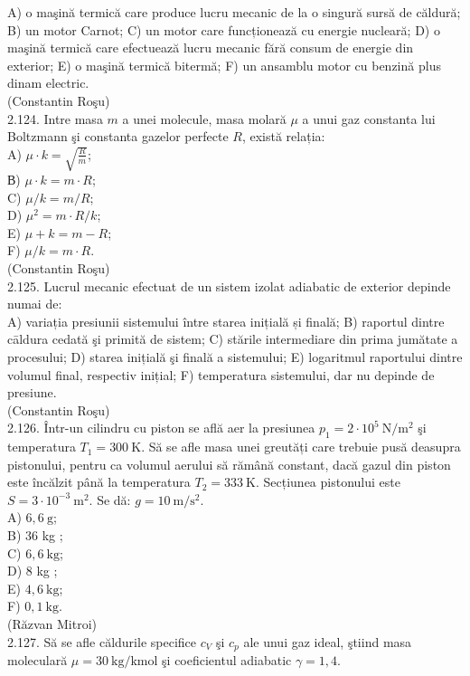 \documentclass[10pt]{article}
\begin{document}
A) o maşină termică care produce lucru mecanic de la o singură sursă de căldură; B) un motor Carnot; C) un motor care funcționează cu energie nucleară; D) o maşină termică care efectuează lucru mecanic fără consum de energie din\\
exterior; E) o maşină termică bitermă; F) un ansamblu motor cu benzină plus dinam electric.\\
(Constantin Roşu)\\
2.124. Intre masa $m$ a unei molecule, masa molară $\mu$ a unui gaz constanta lui Boltzmann şi constanta gazelor perfecte $R$, există relația:\\
A) $\mu \cdot k=\sqrt{\frac{R}{m}}$;\\
В) $\mu \cdot k=m \cdot R$;\\
C) $\mu / k=m / R$;\\
D) $\mu^{2}=m \cdot R / k$;\\
E) $\mu+k=m-R$;\\
F) $\mu / k=m \cdot R$.\\
(Constantin Roşu)\\
2.125. Lucrul mecanic efectuat de un sistem izolat adiabatic de exterior depinde numai de:\\
A) variația presiunii sistemului între starea inițială și finală; B) raportul dintre cāldura cedată şi primită de sistem; C) stările intermediare din prima jumătate a procesului; D) starea inițială şi finală a sistemului; E) logaritmul raportului dintre volumul final, respectiv inițial; F) temperatura sistemului, dar nu depinde de presiune.\\
(Constantin Roşu)\\
2.126. Într-un cilindru cu piston se află aer la presiunea $p_{1}=2 \cdot 10^{5} \mathrm{~N} / \mathrm{m}^{2}$ şi temperatura $T_{1}=300 \mathrm{~K}$. Să se afle masa unei greutăți care trebuie pusă deasupra pistonului, pentru ca volumul aerului să rămână constant, dacă gazul din piston este încălzit până la temperatura $T_{2}=333 \mathrm{~K}$. Secțiunea pistonului este $S=3 \cdot 10^{-3} \mathrm{~m}^{2}$. Se dă: $g=10 \mathrm{~m} / \mathrm{s}^{2}$.\\
A) $6,6 \mathrm{~g}$;\\
B) 36 kg ;\\
C) $6,6 \mathrm{~kg}$;\\
D) 8 kg ;\\
E) $4,6 \mathrm{~kg}$;\\
F) $0,1 \mathrm{~kg}$.\\
(Răzvan Mitroi)\\
2.127. Să se afle căldurile specifice $c_{V}$ şi $c_{p}$ ale unui gaz ideal, ştiind masa moleculară $\mu=30 \mathrm{~kg} / \mathrm{kmol}$ şi coeficientul adiabatic $\gamma=1,4$.
\end{document}
